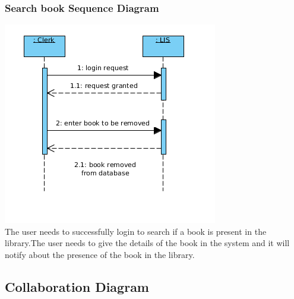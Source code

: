 \documentclass[a4paper]{article}
\begin{document}
\subsubsection*{Search book Sequence Diagram}
\includegraphics[scale=0.50]{images/seqDiagBookRemoval.png}
\\
The user needs to successfully login to search if a book is present in the library.The user needs to give the details of the book in the system and it will notify about the presence of the book in the library.
\\

\subsection{Collaboration Diagram}
\end{document}
